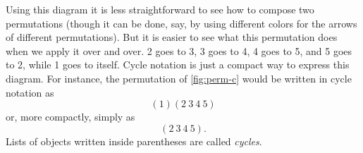 Using this diagram it is less straightforward to see how to compose two permutations (though it can be done, say, by using different colors for the arrows of different permutations).
But it is easier to see what this permutation does when we apply it over and over.
2 goes to 3, 3 goes to 4, 4 goes to 5, and 5 goes to 2, while 1 goes to itself.
Cycle notation is just a compact way to express this diagram.
For instance, the permutation of \autoref{fig:perm-c} would be written in cycle notation as \[ (1)(2\ 3\ 4\ 5) \] or, more compactly, simply as \[ (2\ 3\ 4\ 5). \]
Lists of objects written inside parentheses are called \emph{cycles}.
